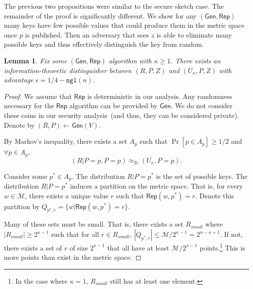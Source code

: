 \documentclass[11pt]{article}
\newcommand{\class}[1]{{\ensuremath{\mathsf{#1}}}}
\newcommand{\gen}{\ensuremath{\class{Gen}}\xspace}
\newcommand{\rep}{\ensuremath{\class{Rep}}\xspace}
\newcommand{\sketch}{\ensuremath{\class{SS}}\xspace}
\newcommand{\rec}{\ensuremath{\class{Rec}}\xspace}
\newcommand{\dis}{\ensuremath{\mathsf{dis}}}
\newcommand{\ngl}{\ensuremath{\mathtt{ngl}}\xspace}
\newtheorem{lemma}[theorem]{Lemma}
\begin{document}
The previous two propositions were similar to the secure sketch case.  The remainder of the proof is significantly different.  We show for any $(\gen, \rep)$ many keys have few possible values that could produce them in the metric space once $p$ is published.  Then an adversary that sees $z$ is able to eliminate many possible keys and thus effectively distinguish the key from random.

\begin{lemma}
\label{lem:fuzz can't get key}
Fix some $(\gen, \rep)$ algorithm with $\kappa \ge 1$.  There exists an information-theoretic distinguisher between $(R, P, Z)$ and $(U_\kappa, P, Z)$ with advantage $\epsilon = 1/4-\ngl(n)$.
\end{lemma}
\begin{proof}
We assume that $\rep$ is deterministic in our analysis.  Any randomness necessary for the \rep algorithm can be provided by $\gen$.  We do not consider these coins in our security analysis~(and thus, they can be considered private).  Denote by $(R, P) \leftarrow \gen(V)$.

By Markov's inequality, there exists a set $A_{p}$ such that $\Pr[p\in A_{p}]\ge 1/2$ and $\forall p\in A_{p}$, 
\[
(R |P =p, P = p ) \approx_{2\epsilon} (U_\kappa , P =p).
\]

Consider some $p^*\in A_{p}$.  %
The distribution $R|P=p^*$ is the set of possible keys.
The distribution $R|P=p^*$ induces a partition on the metric space.  That is, for every $w\in\mathcal{M}$, there exists a unique value $r$ such that $\rep(w, p^*) =r$.  Denote this partition by $Q_{p^*,r} = \{w | \rep(w, p^*) = r\}$.  

Many of these sets must be small.  That is, there exists a set $R_{small}$  where $|R_{small} | \ge 2^{\kappa-1}$ such that for all $r\in R_{small}$,  $|Q_{p^*, r}|\le \mathcal{M}/2^{\kappa-1} = 2^{n-\kappa +1}$.  If not, there exists a set of $r$ of size $2^{\kappa-1}$ that all have at least $\mathcal{M}/2^{\kappa-1}$ points.\footnote{In the case where $\kappa=1$, $R_{small}$ still has at least one element.}  This is more points than exist in the metric space.  


\end{proof}
\end{document}
